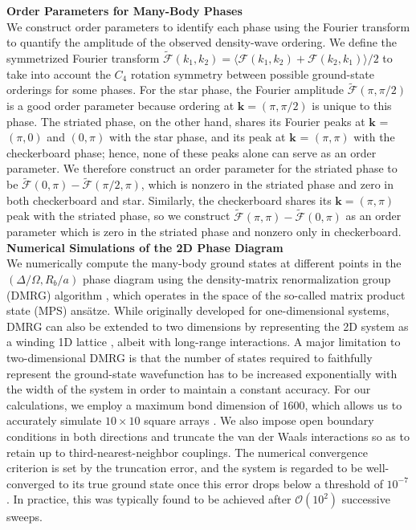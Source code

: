 \documentclass[reprint,twocolumn,secnumarabic,amssymb, aps, prl]{revtex4-1}
\begin{document}
\noindent\textbf{Order Parameters for Many-Body Phases}\\
We construct order parameters to identify each phase using the Fourier transform to quantify the amplitude of the observed density-wave ordering. We define the symmetrized Fourier transform $ \tilde{\mathcal{F}} (k_1,k_2) = \langle \mathcal{F}(k_1,k_2) + \mathcal{F}(k_2,k_1) \rangle/2$ to take into account the $\textit{C}_4$ rotation symmetry between possible ground-state orderings for some phases. For the star phase, the Fourier amplitude $\tilde{\mathcal{F}} (\pi, \pi/2)$ is a good order parameter because ordering at $\mathbf{k} = (\pi, \pi/2)$ is unique to this phase. The striated phase, on the other hand, shares its Fourier peaks at $\mathbf{k}$ = $(\pi, 0)$ and $(0, \pi)$ with the star phase, and its peak at $\mathbf{k}$ = $(\pi, \pi)$ with the checkerboard phase; hence, none of these peaks alone can serve as an order parameter. 
We therefore construct an order parameter for the striated phase to be $\tilde{\mathcal{F}} (0, \pi) - \tilde{\mathcal{F}} (\pi/2, \pi)$, which is nonzero in the striated phase and zero in both checkerboard and star. Similarly, the checkerboard shares its $\mathbf{k} = (\pi, \pi)$ peak with the striated phase, so we construct $\tilde{\mathcal{F}} (\pi,\pi) - \tilde{\mathcal{F}} (0, \pi)$ as an order parameter which is zero in the striated phase and nonzero only in checkerboard. \\

\noindent\textbf{Numerical Simulations of the 2D Phase Diagram}\\
We numerically compute the many-body ground states at different points in the $(\Delta/\Omega, R_b/a)$ phase diagram using the density-matrix renormalization group (DMRG) algorithm \cite{white1992density,white1993density}, which operates in the space of the so-called matrix product state (MPS) ans\"{a}tze.
While originally developed for one-dimensional systems, DMRG can also be extended to two dimensions by representing the 2D system as a winding 1D lattice \cite{stoudenmire2012studying}, albeit with long-range interactions. A major limitation to two-dimensional DMRG is that the number of states required to faithfully represent the ground-state wavefunction has to be increased exponentially with the width of the system in order to maintain a constant accuracy. For our calculations, we employ a maximum bond dimension of $1600$, which allows us to accurately simulate $10\times 10$ square arrays \cite{Rhine2020}. We also impose open boundary conditions in both directions and truncate the van der Waals interactions so as to retain up to third-nearest-neighbor couplings.  
The numerical convergence criterion is set by the truncation error, and the system is regarded to be well-converged to its true ground state once this error drops below a threshold of $10^{-7}$. In practice, this was typically found to be achieved after $\mathcal{O}(10^2)$ successive sweeps.
\end{document}
